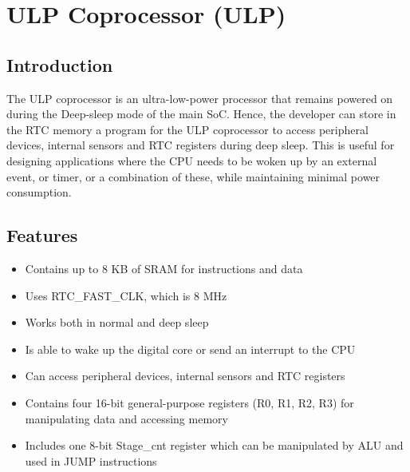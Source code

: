 \documentclass[main\_\_EN.tex]{subfiles}
\begin{document}

\ifglobal
\else
    \listoftodos
    {\let\clearpage\relax \listofdonetodos}
    \tableofcontents
\fi



\hypertarget{ulp}{}
\chapter{ULP Coprocessor (ULP)}
\label{mod:ulp}

\section{Introduction}

The ULP coprocessor is an ultra-low-power processor that remains powered on during the Deep-sleep mode of the main SoC. Hence, the developer can store in the RTC memory a program for the ULP coprocessor to access peripheral devices, internal sensors and RTC registers during deep sleep. This is useful for designing applications where the CPU needs to be woken up by an external event, or timer, or a combination of these, while maintaining minimal power consumption.

\section{Features}

\begin{itemize}
    \item Contains up to 8 KB of SRAM for instructions and data
    \item Uses RTC\_FAST\_CLK, which is 8 MHz
    \item Works both in normal and deep sleep
    \item Is able to wake up the digital core or send an interrupt to the CPU
    \item Can access peripheral devices, internal sensors and RTC registers
    \item Contains four 16-bit general-purpose registers (R0, R1, R2, R3) for manipulating data and accessing memory
    \item Includes one 8-bit Stage\_cnt register which can be manipulated by ALU and used in JUMP instructions
\end{itemize}
\end{document}
